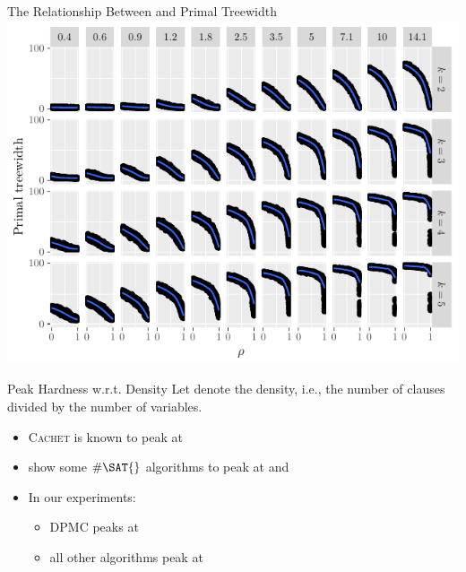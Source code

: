 \documentclass{beamer}
\begin{document}
\begin{frame}{The Relationship Between \structure{$\rho$} and Primal Treewidth}
  \includegraphics{regular_repetitiveness.pdf}
\end{frame}


\begin{frame}{Peak Hardness w.r.t. Density}
  Let \structure{$\mu$} denote the \alert{density}, i.e., the number of clauses
  divided by the number of variables.
  \begin{itemize}
    \item \textsc{Cachet} is known to peak at 
          \textcolor{gray}{\parencite{DBLP:conf/sat/SangBBKP04}}
    \item \textcolor{gray}{\textcite{DBLP:conf/aaai/Pehoushek00}} show some
          $\#\SAT{}$ algorithms to peak at  and
          \pause
    \item In our experiments:
    \begin{itemize}
      \item \textsc{DPMC} peaks at 
      \item all other algorithms peak at 
    \end{itemize}
  \end{itemize}
\end{frame}
\end{document}
